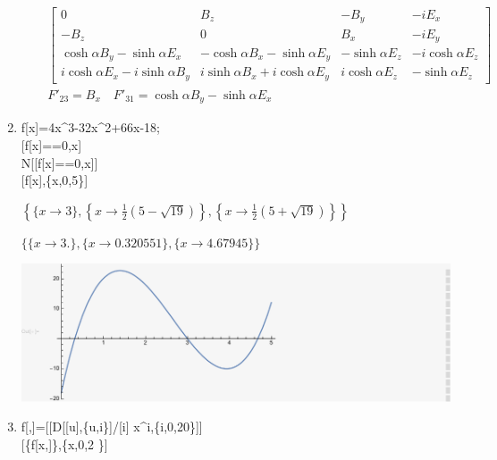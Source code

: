 \documentclass[12pt]{article}
\begin{document}
\begin{enumerate}
\begin{enumerate}
\begin{gather*}
\begin{bmatrix}
                    0                                   & B_z                                 & -B_y              & -i E_x             \\
                    -B_z                                & 0                                   & B_x               & -i E_y             \\
                    \cosh\alpha B_y-\sinh\alpha E_x     & -\cosh\alpha B_x-\sinh\alpha E_y    & -\sinh\alpha E_z & -i \cosh\alpha E_z \\
                    i \cosh\alpha E_x-i \sinh\alpha B_y & i \sinh\alpha B_x+i \cosh\alpha E_y & i \cosh\alpha E_z & -\sinh\alpha E_z
                \end{bmatrix}\\
                F'_{23}=B_x\quad F'_{31}=\cosh\alpha B_y-\sinh\alpha E_x
            \end{gather*}
        \end{enumerate}
        \item
        f[x]=4x{}^{\wedge}3-32x{}^{\wedge}2+66x-18;\\
        [f[x]==0,x]\\
        N[[f[x]==0,x]]\\
        [f[x],\{x,0,5\}]

        \begin{doublespace}
            \noindent\(\left\{\{x\to 3\},\left\{x\to \frac{1}{2} \left(5-\sqrt{19}\right)\right\},\left\{x\to \frac{1}{2} \left(5+\sqrt{19}\right)\right\}\right\}\)
        \end{doublespace}

        \begin{doublespace}
            \noindent\(\{\{x\to 3.\},\{x\to 0.320551\},\{x\to 4.67945\}\}\)
        \end{doublespace}

        \includegraphics{HW_6_screenshots/q_2}
        \item
        f[,]=[[D[[u],\{u,i\}]/[i] x{}^{\wedge}i,\{i,0,20\}]]\\
        [\{f[x,]\},\{x,0,2 \}]


\end{enumerate}
\end{document}
